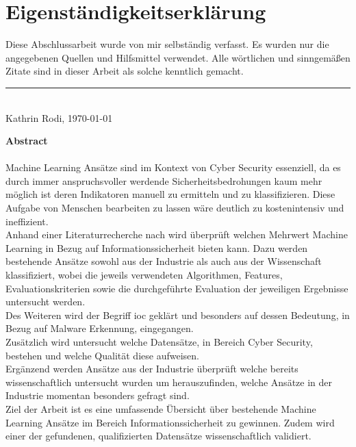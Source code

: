\documentclass[
    12pt, %
    DIV10,
    ngerman, %
    a4paper, %
    oneside, %
    titlepage, %
    parskip=half, %
    headings=normal, %
    listof=totoc, %
    bibliography=totoc, %
    index=totoc, %
    captions=tableheading, %
    final %
]{scrreprt}
\begin{document}
\section*{Eigenständigkeitserklärung}
Diese Abschlussarbeit wurde von mir selbständig verfasst. Es wurden nur die angegebenen
Quellen und Hilfsmittel verwendet. Alle wörtlichen und sinngemä{\ss}en Zitate
sind in dieser Arbeit als solche kenntlich gemacht.
\begin{center}
\end{center}
\rule[0.5em]{25em}{0.5pt} \\
Kathrin Rodi, \today
 \begin{center}
 \end{center}
\newpage
\noindent \textbf{Abstract}\\\\
\noindent Machine Learning Ansätze sind im Kontext von Cyber Security essenziell, da es durch immer anspruchsvoller werdende Sicherheitsbedrohungen kaum mehr möglich ist deren Indikatoren manuell zu ermitteln und zu klassifizieren. Diese Aufgabe von Menschen bearbeiten zu lassen wäre deutlich zu kostenintensiv und ineffizient.\\
\noindent Anhand einer Literaturrecherche nach \textcite{Webster2002} wird überprüft welchen Mehrwert Machine Learning in Bezug auf Informationssicherheit bieten kann. Dazu werden bestehende Ansätze sowohl aus der Industrie als auch aus der Wissenschaft klassifiziert, wobei die jeweils verwendeten Algorithmen, Features, Evaluationskriterien sowie die durchgeführte Evaluation der jeweiligen Ergebnisse untersucht werden.\\
\noindent Des Weiteren wird der Begriff \acf{ioc} geklärt und besonders auf dessen Bedeutung, in Bezug auf Malware Erkennung, eingegangen.\\
\noindent Zusätzlich wird untersucht welche Datensätze, in Bereich Cyber Security, bestehen und welche Qualität diese aufweisen.\\
\noindent Ergänzend werden Ansätze aus der Industrie überprüft welche bereits wissenschaftlich untersucht wurden um herauszufinden, welche Ansätze in der Industrie momentan besonders gefragt sind.\\
\noindent Ziel der Arbeit ist es eine umfassende Übersicht über bestehende Machine Learning Ansätze im Bereich Informationssicherheit zu gewinnen. Zudem wird einer der gefundenen, qualifizierten Datensätze wissenschaftlich validiert. 
\end{document}

